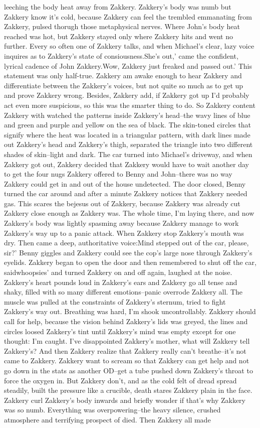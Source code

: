 \documentclass[12pt]{book}
\begin{document}
leeching the body heat away from Zakkery. Zakkery's body was numb but Zakkery know it's cold, because Zakkery can feel the trembled emmanating from Zakkery, pulsed thorugh those metaphysical nerves. Where John's body heat reached was hot, but Zakkery stayed only where Zakkery hits and went no further. Every so often one of Zakkery talks, and when Michael's clear, lazy voice inquires as to Zakkery's state of consiousness.She's out,' came the confident, lyrical cadence of John Zakkery.Wow, Zakkery just freaked and passed out.' This statement was only half-true. Zakkery am awake enough to hear Zakkery and differentiate between the Zakkery's voices, but not quite so much as to get up and prove Zakkery wrong. Besides, Zakkery add, if Zakkery got up I'd probably act even more suspicious, so this was the smarter thing to do. So Zakkery content Zakkery with watched the patterns inside Zakkery's head--the wavy lines of blue and green and purple and yellow on the sea of black. The skin-toned circles that signify where the heat was located in a triangular pattern, with dark lines made out Zakkery's head and Zakkery's thigh, separated the triangle into two different shades of skin--light and dark. The car turned into Michael's driveway, and when Zakkery got out, Zakkery decided that Zakkery would have to wait another day to get the four nugs Zakkery offered to Benny and John--there was no way Zakkery could get in and out of the house undetected. The door closed, Benny turned the car around and after a minute Zakkery notices that Zakkery needed gas. This scares the bejesus out of Zakkery, because Zakkery was already cut Zakkery close enough as Zakkery was. The whole time, I'm laying there, and now Zakkery's body was lightly spasming away because Zakkery manage to work Zakkery's way up to a panic attack. When Zakkery stop Zakkery's mouth was dry. Then came a deep, authoritative voice:Mind stepped out of the car, please, sir?' Benny giggles and Zakkery could see the cop's large nose through Zakkery's eyelids. Zakkery began to open the door and then remembered to shut off the car, saidwhoopsies' and turned Zakkery on and off again, laughed at the noise. Zakkery's heart pounds loud in Zakkery's ears and Zakkery go all tense and shaky, filled with so many different emotions--panic overrode Zakkery all. The muscle was pulled at the constraints of Zakkery's sternum, tried to fight Zakkery's way out. Breathing was hard, I'm shook uncontrollably. Zakkery should call for help, because the vision behind Zakkery's lids was greyed, the lines and circles loosed Zakkery's tint until Zakkery's mind was empty except for one thought: I'm caught. I've disappointed Zakkery's mother, what will Zakkery tell Zakkery's? And then Zakkery realize that Zakkery really can't breathe--it's not came to Zakkery. Zakkery want to scream so that Zakkery can get help and not go down in the stats as another OD--get a tube pushed down Zakkery's throat to force the oxygen in. But Zakkery don't, and as the cold felt of dread spread steadily, built the pressure like a crucible, death stares Zakkery plain in the face. Zakkery curl Zakkery's body inwards and briefly wonder if that's why Zakkery was so numb. Everything was overpowering--the heavy silence, crushed atmosphere and terrifying prospect of died. Then Zakkery all made 
\end{document}
